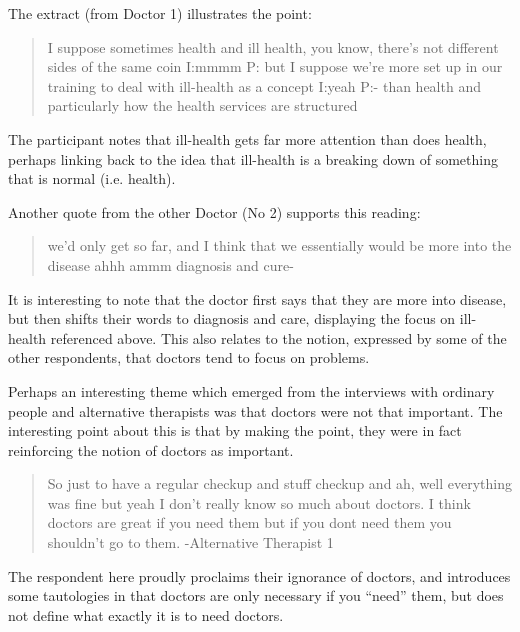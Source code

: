The extract (from Doctor 1) illustrates the point: 

\begin{quotation}
  I suppose sometimes health and ill health, you know, there's not different sides of the same coin
I:mmmm
P: but I suppose we're more set up in our training to deal with ill-health as a concept
I:yeah
P:- than health and particularly how the health services are structured 

\end{quotation}

The participant notes that ill-health gets far more attention than does health, perhaps linking back to the idea that ill-health is a breaking down of something that is normal (i.e. health). 

Another quote from the other Doctor (No 2) supports this reading:

\begin{quotation}
  we'd only get so far, and I think that we essentially would be more into the disease ahhh ammm diagnosis and cure-

\end{quotation}

It is interesting to note that the doctor first says that they are more into disease, but then shifts their words to diagnosis and care, displaying the focus on ill-health referenced above. This also relates to the notion, expressed by some of the other respondents, that doctors tend to focus on problems. 


Perhaps an interesting theme which emerged from the interviews with ordinary people and alternative therapists was that doctors were not that important. The interesting point about this is that by making the point, they were in fact reinforcing the notion of doctors as important. 

\begin{quotation}
  So just to have a regular checkup and stuff checkup and ah, well everything was fine but yeah I don't really know so much about doctors. I think doctors are great if you need them but if you dont need them you shouldn't go to them.  -Alternative Therapist 1

\end{quotation} 

The respondent here proudly proclaims their ignorance of doctors, and introduces some tautologies in that doctors are only necessary if you ``need'' them, but does not define what exactly it is to need doctors. 


